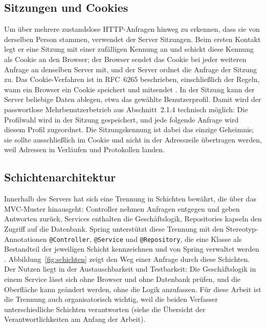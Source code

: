 \documentclass[12pt,a4paper]{scrreprt}
\begin{document}
\subsection{Sitzungen und Cookies}
Um über mehrere zustandslose HTTP-Anfragen hinweg zu erkennen, dass sie von derselben Person stammen, verwendet der Server Sitzungen. Beim ersten Kontakt legt er eine Sitzung mit einer zufälligen Kennung an und schickt diese Kennung als Cookie an den Browser; der Browser sendet das Cookie bei jeder weiteren Anfrage an denselben Server mit, und der Server ordnet die Anfrage der Sitzung zu. Das Cookie-Verfahren ist in RFC~6265 beschrieben, einschließlich der Regeln, wann ein Browser ein Cookie speichert und mitsendet \cite{rfc6265}. In der Sitzung kann der Server beliebige Daten ablegen, etwa das gewählte Benutzerprofil. Damit wird der passwortlose Mehrbenutzerbetrieb aus Abschnitt~2.1.4 technisch möglich: Die Profilwahl wird in der Sitzung gespeichert, und jede folgende Anfrage wird diesem Profil zugeordnet. Die Sitzungskennung ist dabei das einzige Geheimnis; sie sollte ausschließlich im Cookie und nicht in der Adresszeile übertragen werden, weil Adressen in Verläufen und Protokollen landen.

\subsection{Schichtenarchitektur}
Innerhalb des Servers hat sich eine Trennung in Schichten bewährt, die über das MVC-Muster hinausgeht: Controller nehmen Anfragen entgegen und geben Antworten zurück, Services enthalten die Geschäftslogik, Repositories kapseln den Zugriff auf die Datenbank. Spring unterstützt diese Trennung mit den Stereotyp-Annotationen \texttt{@Controller}, \texttt{@Service} und \texttt{@Repository}, die eine Klasse als Bestandteil der jeweiligen Schicht kennzeichnen und von Spring verwaltet werden \cite{springstereotypes}. Abbildung~\ref{fig:schichten} zeigt den Weg einer Anfrage durch diese Schichten. Der Nutzen liegt in der Austauschbarkeit und Testbarkeit: Die Geschäftslogik in einem Service lässt sich ohne Browser und ohne Datenbank prüfen, und die Oberfläche kann geändert werden, ohne die Logik anzufassen. Für diese Arbeit ist die Trennung auch organisatorisch wichtig, weil die beiden Verfasser unterschiedliche Schichten verantworten (siehe die Übersicht der Verantwortlichkeiten am Anfang der Arbeit).
\end{document}
